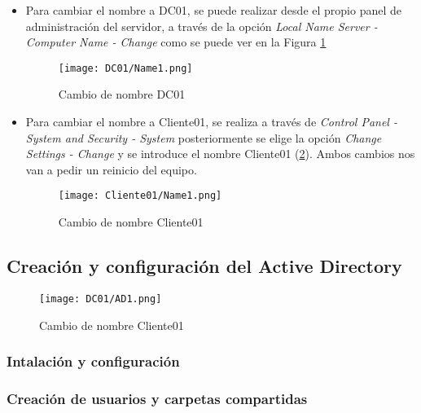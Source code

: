 \begin{itemize}
\item Para cambiar el nombre a DC01, se puede realizar desde el propio panel de administración del servidor, a través de la opción {\it Local Name Server - Computer Name - Change} como se puede ver en la Figura \ref{DC01-Name1}
\begin{figure}[H] %
\begin{center}
\texttt{[image: DC01/Name1.png]}
\end{center}
\caption{Cambio de nombre DC01}
\label{DC01-Name1}
\end{figure}

\item Para cambiar el nombre a Cliente01, se realiza a través de {\it Control Panel - System and Security - System} posteriormente se elige la opción {\it Change Settings - Change} y se introduce el nombre Cliente01 (\ref{Cliente01-Name1}). Ambos cambios nos van a pedir un reinicio del equipo.  
\begin{figure}[H] %
\begin{center}
\texttt{[image: Cliente01/Name1.png]}
\end{center}
\caption{Cambio de nombre Cliente01}
\label{Cliente01-Name1}
\end{figure}

\end{itemize}

\subsection{Creación y configuración del Active Directory}

\begin{figure}[H] %
\begin{center}
\texttt{[image: DC01/AD1.png]}
\end{center}
\caption{Cambio de nombre Cliente01}
\label{DC01-AD1}
\end{figure}




\subsubsection{Intalación y configuración}
\subsubsection{Creación de usuarios y carpetas compartidas}
